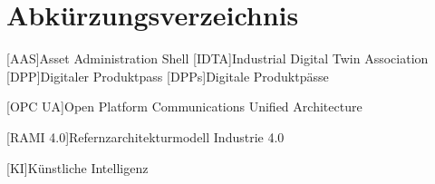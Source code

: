 \section*{Abkürzungsverzeichnis}
\begin{singlespacing}
\end{singlespacing}
\begin{acronym}

[AAS]{Asset Administration Shell}
[IDTA]{Industrial Digital Twin Association}
[DPP]{Digitaler Produktpass}
[DPPs]{Digitale Produktpässe}

[OPC UA]{Open Platform Communications Unified Architecture}

[RAMI 4.0]{Refernzarchitekturmodell Industrie 4.0}

[KI]{Künstliche Intelligenz}

\end{acronym}



\newpage